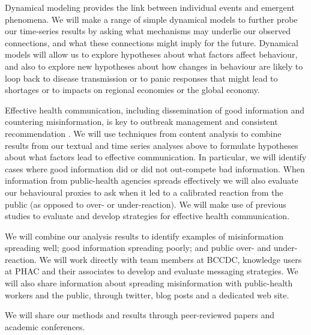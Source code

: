  Dynamical modeling provides the link between individual events and emergent phenomena. We will make a range of simple dynamical models to further probe our time-series results by asking what mechanisms may underlie our observed connections, and what these connections might imply for the future. Dynamical models will allow us to explore hypotheses about what factors affect behaviour, and also to explore new hypotheses about how changes in behaviour are likely to loop back to disease transmission or to panic responses that might lead to shortages or to impacts on regional economies or the global economy.


Effective health communication, including dissemination of good information and countering misinformation, is key to outbreak management \citep{SongSong17} and consistent recommendation \citep{OhlrSugg18,SongSong17}.
We will use techniques from content analysis \citep{Finf13 ,Mayr14} to combine results from our textual and time series analyses above to formulate hypotheses about what factors lead to effective communication. In particular, we will identify cases where good information did or did not out-compete bad information. When information from public-health agencies spreads effectively we will also evaluate our behavioural proxies to ask when it led to a calibrated reaction from the public (as opposed to over- or under-reaction).
We will make use of previous studies to evaluate \citep{Ding14,FarmSher18,NowaShee15,Tam18} and develop \citep{BekaBigm18, ShenShee15, SongSong17} strategies for effective health communication.


 We will combine our analysis results to identify examples of misinformation spreading well; good information spreading poorly; and public over- and under-reaction. We will work directly with team members at BCCDC, knowledge users at PHAC and their associates to develop and evaluate messaging strategies. We will also share information about spreading misinformation with public-health workers and the public, through twitter, blog posts and a dedicated web site. 

 We will share our methods and results through peer-reviewed papers and academic conferences. 

